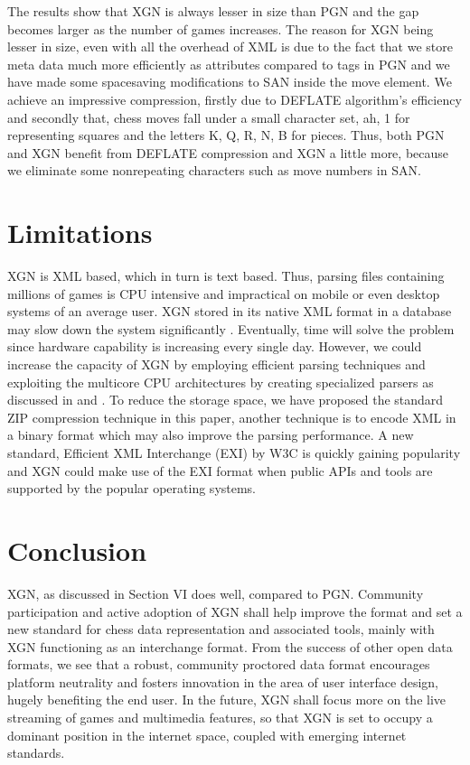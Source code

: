 \documentclass[conference]{IEEEtran}
\begin{document}
The results show that XGN is always lesser in size than PGN and the gap becomes larger as the number of games increases. The reason for XGN being lesser in size, even with all the overhead of XML is due to the fact that we store meta data much more efficiently as attributes compared to tags in PGN and we have made some space\textendash saving modifications to SAN inside the move element. We achieve an impressive compression, firstly due to DEFLATE algorithm's efficiency and secondly that, chess moves fall under a small character set, a\textendash h, 1 for representing squares and the letters K, Q, R, N, B for pieces. Thus, both PGN and XGN benefit from DEFLATE compression and XGN a little more, because we eliminate some non\textendash repeating characters such as move numbers in SAN.




\section{Limitations}

XGN is XML based, which in turn is text based. Thus, parsing files containing millions of games is CPU intensive and impractical on mobile or even desktop systems of an average user. XGN stored in its native XML format in a database may slow down the system significantly \cite{ab11}
. Eventually, time will solve the problem since hardware capability is increasing every single day. However, we could increase the capacity of XGN by employing efficient parsing techniques and exploiting the multi\textendash core CPU architectures by creating specialized parsers as discussed in \cite{ab12}
 and \cite{ab13}
. To reduce the storage space, we have proposed the standard ZIP compression technique in this paper, another technique is to encode XML in a binary format which may also improve the parsing performance. A new standard, Efficient XML Interchange (EXI) \cite{ab05}
 by W3C is quickly gaining popularity and XGN could make use of the EXI format when public APIs and tools are supported by the popular operating systems.




\section{Conclusion}

XGN, as discussed in Section VI does well, compared to PGN. Community participation and active adoption of XGN shall help improve the format and set a new standard for chess data representation and associated tools, mainly with XGN functioning as an interchange format. From the success of other open data formats, we see that a robust, community proctored data format encourages platform neutrality and fosters innovation in the area of user interface design, hugely benefiting the end user. In the future, XGN shall focus more on the live streaming of games and multimedia features, so that XGN is set to occupy a dominant position in the internet space, coupled with emerging internet standards.





\nocite{*}

\end{document}
